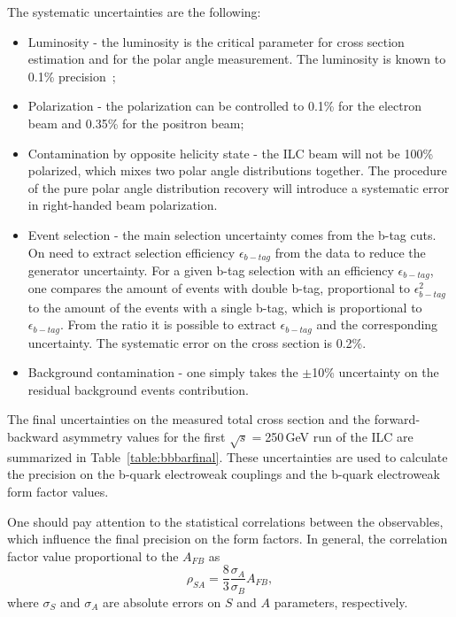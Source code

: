 The systematic uncertainties are the following:
\begin{itemize}
	\item Luminosity - the luminosity is the critical parameter for cross section estimation and for the polar angle measurement. The luminosity is known to 0.1\% precision~\cite{bib:Lumi};
	
	\item Polarization - the polarization can be controlled to 0.1\% for the electron beam and 0.35\% for the positron beam;
	
	\item Contamination by opposite helicity state - the ILC beam will not be 100\% polarized, which mixes two polar angle distributions together. The procedure of the pure polar angle distribution recovery will introduce a systematic error in right-handed beam polarization.  
	
	\item Event selection -  the main selection uncertainty comes from the b-tag cuts. On need to extract selection efficiency $\epsilon_{b-tag}$ from the data to reduce the generator uncertainty. For a given b-tag selection with an efficiency $\epsilon_{b-tag}$, one compares the amount of events with double b-tag, proportional to $\epsilon_{b-tag}^2$ to the amount of the events with a single b-tag, which is proportional to $\epsilon_{b-tag}$. From the ratio it is possible to extract $\epsilon_{b-tag}$ and the corresponding uncertainty. The systematic error on the cross section is 0.2\%.
	
	\item Background contamination - one simply takes the $\pm$10\% uncertainty on the residual background events contribution. 
\end{itemize}

The final uncertainties on the measured total cross section and the forward-backward asymmetry values for the first $\sqrt{s}=$250\,GeV run of the ILC are summarized in Table~\ref{table:bbbarfinal}. These uncertainties are used to calculate the precision on the b-quark electroweak couplings and the b-quark electroweak form factor values.


One should pay attention to the statistical correlations between the observables, which influence the final precision on the form factors. 
In general, the correlation factor value proportional to the $A_{FB}$ as \[\rho_{SA} = \frac{8}{3}\frac{\sigma_A}{\sigma_B}A_{FB},\]
where $\sigma_S$ and $\sigma_A$ are absolute errors on $S$ and $A$ parameters, respectively.


